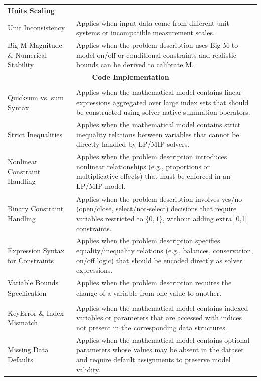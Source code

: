 \documentclass[sigconf, nonacm]{acmart}
\begin{document}
\begin{table}[!t]
\begin{tabularx}{\textwidth}{l X}
\multicolumn{2}{l}{\textbf{Units Scaling}}\\
Unit Inconsistency & Applies when input data come from different unit systems or incompatible measurement scales. \\
Big-M Magnitude \& Numerical Stability & Applies when the problem description uses Big-M to model on/off or conditional constraints and realistic bounds can be derived to calibrate M. \\
\midrule

\multicolumn{2}{c}{\textbf{Code Implementation}}\\
\addlinespace[3pt]

\multicolumn{2}{l}{\textbf{Solver \& API Syntax}}\\
Quicksum vs. sum Syntax & Applies when the mathematical model contains linear expressions aggregated over large index sets that should be constructed using solver-native summation operators. \\
Strict Inequalities & Applies when the mathematical model contains strict inequality relations between variables that cannot be directly handled by LP/MIP solvers. \\
Nonlinear Constraint Handling & Applies when the problem description introduces nonlinear relationships (e.g., proportions or multiplicative effects) that must be enforced in an LP/MIP model. \\
Binary Constraint Handling & Applies when the problem description involves yes/no (open/close, select/not-select) decisions that require variables restricted to $\{0,1\}$, without adding extra [0,1] constraints. \\
Expression Syntax for Constraints & Applies when the problem description specifies equality/inequality relations (e.g., balances, conservation, on/off logic) that should be encoded directly as solver expressions. \\
Variable Bounds Specification & Applies when the problem description requires the change of a variable from one value to another. \\
\addlinespace[2pt]

\multicolumn{2}{l}{\textbf{Data I/O \& Validation}}\\
KeyError \& Index Mismatch & Applies when the mathematical model contains indexed variables or parameters that are accessed with indices not present in the corresponding data structures. \\
Missing Data Defaults & Applies when the mathematical model contains optional parameters whose values may be absent in the dataset and require default assignments to preserve model validity. \\

\bottomrule
\end{tabularx}
\end{table}
\end{document}
